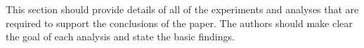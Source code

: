 \documentclass[a4paper,num-refs]{oup-contemporary}
\begin{document}
This section should provide details of all of the experiments and analyses that are required to support the conclusions of the paper. The authors should make clear the goal of each analysis and state the basic findings.


%
\end{document}
